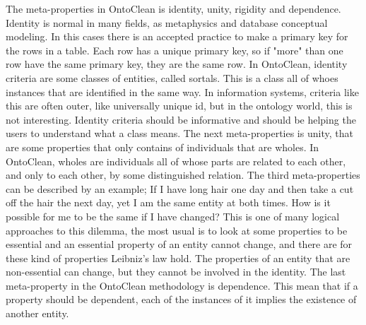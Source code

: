 The meta-properties in OntoClean is identity, unity, rigidity and dependence. Identity is normal in many fields, as metaphysics and database conceptual modeling. In this cases there is an accepted practice to make a primary key for the rows in a table. Each row has a unique primary key, so if "more" than one row have the same primary key, they are the same row. In OntoClean, identity criteria are some classes of entities, called sortals. This is a class all of whoes instances that are identified in the same way. In information systems, criteria like this are often outer, like universally unique id, but in the ontology world, this is not interesting. Identity criteria should be informative and should be helping the users to understand what a class means. The next meta-properties is unity, that are some properties that only contains of individuals that are wholes. In OntoClean, wholes are individuals all of whose parts are related to each other, and only to each other, by some distinguished relation. The third meta-properties can be described by an example; If I have long hair one day and then take a cut off the hair the next day, yet I am the same entity at both times. How is it possible for me to be the same if I have changed? This is one of many logical approaches to this dilemma, the most usual is to look at some properties to be essential and an essential property of an entity cannot change, and there are for these kind of properties Leibniz's law hold. The properties of an entity that are non-essential can change, but they cannot be involved in the identity. The last meta-property in the OntoClean methodology is dependence. This mean that if a property should be dependent, each of the instances of it implies the existence of another entity.
\cite{yu,website:wikipediaontoclean}


